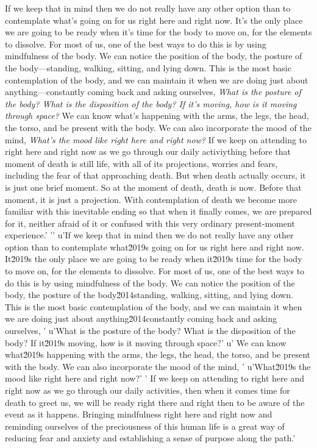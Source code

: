 If we keep that in mind then we do not really have any other option 
than to contemplate what's going on for us right here and right now. 
It's the only place we are going to be ready when it's time for the 
body to move on, for the elements to dissolve. For most of us, one of 
the best ways to do this is by using mindfulness of the body. We can 
notice the position of the body, the posture of the body---standing, 
walking, sitting, and lying down. This is the most basic contemplation 
of the body, and we can maintain it when we are doing just about 
anything---constantly coming back and asking ourselves, \emph{What is 
the posture of the body? What is the disposition of the body? If it's 
moving, how is it moving through space?} We can know what's happening 
with the arms, the legs, the head, the torso, and be present with the 
body. We can also incorporate the mood of the mind, \emph{What's the 
mood like right here and right now?} If we keep on attending to right 
here and right now as we go through our daily activiything before that moment of death is still life, with all of its projections, worries and fears, including the fear of that approaching death. But when death actually occurs, it is just one brief moment. So at the moment of death, death is now. Before that moment, it is just a projection. With contemplation of death we become more familiar with this inevitable ending so that when it finally comes, we are prepared for it, neither afraid of it or confused with this very ordinary present-moment experience.'
'\n'
u'If we keep that in mind then we do not really have any other option than to contemplate what\u2019s going on for us right here and right now. It\u2019s the only place we are going to be ready when it\u2019s time for the body to move on, for the elements to dissolve. For most of us, one of the best ways to do this is by using mindfulness of the body. We can notice the position of the body, the posture of the body\u2014standing, walking, sitting, and lying down. This is the most basic contemplation of the body, and we can maintain it when we are doing just about anything\u2014constantly coming back and asking ourselves, '
u'What is the posture of the body? What is the disposition of the body? If it\u2019s moving, how is it moving through space?'
u' We can know what\u2019s happening with the arms, the legs, the head, the torso, and be present with the body. We can also incorporate the mood of the mind, '
u'What\u2019s the mood like right here and right now?'
' If we keep on attending to right here and right now as we go through our daily activities, then when it comes time for death to greet us, we will be ready right there and right then to be aware of the event as it happens. Bringing mindfulness right here and right now and reminding ourselves of the preciousness of this human life is a great way of reducing fear and anxiety and establishing a sense of purpose along the path.'
